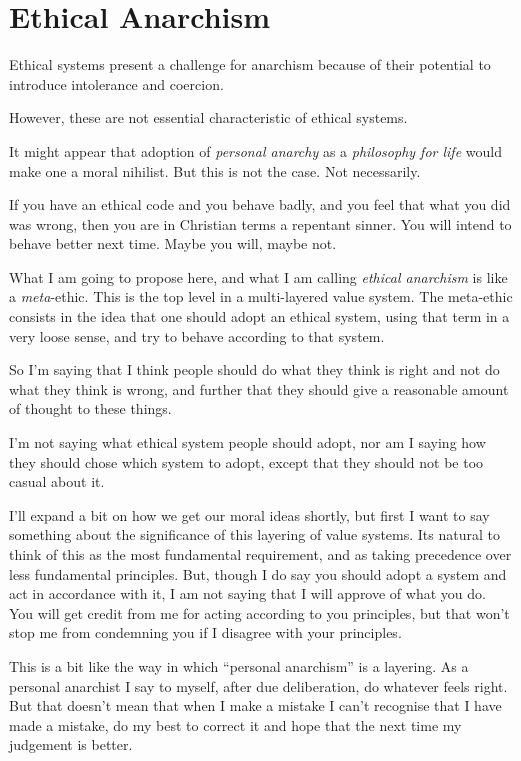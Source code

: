 \section{Ethical Anarchism}\label{Ethical}

Ethical systems present a challenge for anarchism because of their potential to introduce intolerance and coercion.

However, these are not essential characteristic of ethical systems.

It might appear that adoption of {\it personal anarchy} as a {\it philosophy for life} would make one a moral nihilist.
But this is not the case.
Not necessarily.

If you have an ethical code and you behave badly, and you feel that what you did was wrong, then you are in Christian terms a repentant sinner.
You will intend to behave better next time.
Maybe you will, maybe not.

What I am going to propose here, and what I am calling {\it ethical anarchism} is like a {\it meta}-ethic.
This is the top level in a multi-layered value system.
The meta-ethic consists in the idea that one should adopt an ethical system, using that term in a very loose sense, and try to behave according to that system.

So I'm saying that I think people should do what they think is right and not do what they think is wrong, and further that they should give a reasonable amount of thought to these things.

I'm not saying what ethical system people should adopt, nor am I saying how they should chose which system to adopt, except that they should not be too casual about it.

I'll expand a bit on how we get our moral ideas shortly, but first I want to say something about the significance of this layering of value systems.
Its natural to think of this as the most fundamental requirement, and as taking precedence over less fundamental principles.
But, though I do say you should adopt a system and act in accordance with it, I am not saying that I will approve of what you do.
You will get credit from me for acting according to you principles, but that won't stop me from condemning you if I disagree with your principles.

This is a bit like the way in which ``personal anarchism'' is a layering.
As a personal anarchist I say to myself, after due deliberation, do whatever feels right.
But that doesn't mean that when I make a mistake I can't recognise that I have made a mistake, do my best to correct it and hope that the next time my judgement is better.

